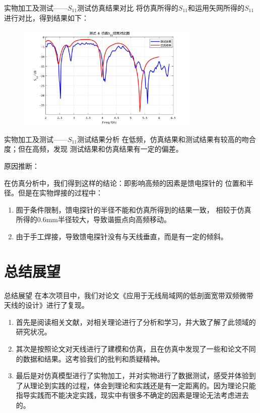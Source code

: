 \documentclass[10pt]{beamer}
\begin{document}
\begin{frame}{实物加工及测试——{\normalsize $S_{11}$测试仿真结果对比}}
	\qquad 
	将仿真所得的$S_{11}$和运用矢网所得的$S_{11}$进行对比，得到结果如下：

	\begin{figure}[htbp]
		\centering
		\includegraphics[height=5cm]{figs/test_simulation.jpg}
	\end{figure}

\end{frame}


\begin{frame}{实物加工及测试——{\normalsize $S_{11}$测试结果分析}}
	\qquad 在低频，仿真结果和测试结果有较高的吻合度；但在高频，发现
	测试结果和仿真结果有一定的偏差。\pause

	\bigskip
	\qquad 原因推断：

	\qquad 在仿真分析中，我们得到这样的结论：即影响高频的因素是馈电探针的
	位置和半径。但是在实物焊接的过程中：

	\begin{enumerate}

		\item 囿于条件限制，馈电探针的半径不能和仿真所得到的结果一致，
		相较于仿真所得的0.6mm半径较大，导致谐振点向高频移动。
		\item 由于手工焊接，导致馈电探针没有与天线垂直，而是有一定的倾斜。
		 
	\end{enumerate}
	
	
\end{frame}


\section{总结展望}

\begin{frame}{总结展望}
	\qquad 在本次项目中，我们对论文《应用于无线局域网的低剖面宽带双频微带天线的设计》进行了复现。
	\begin{enumerate}
		\item 	首先是阅读相关文献，对相关理论进行了分析和学习，并大致了解了此领域的研究状况。\pause
		\item 其次是按照论文对天线进行了建模和仿真，且在仿真中发现了一些和论文不同的数据和结果。这考验我们的批判和质疑精神。\pause
		\item 最后是对仿真模型进行了实物加工，并对实物进行了数据测试，感受并体验到了从理论到实践的过程，体会到理论和实践还是有一定距离的。因为理论只能指导实践而不能决定实践，现实中有很多不确定的因素是理论无法考虑进去的。
	\end{enumerate}
\end{frame}
\end{document}
